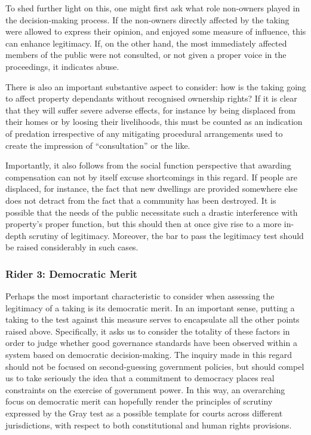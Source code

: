 To shed further light on this, one might first ask what role non-owners played in the decision-making process. If the non-owners directly affected by the taking were allowed to express their opinion, and enjoyed some measure of influence, this can enhance legitimacy. If, on the other hand, the most immediately affected members of the public were not consulted, or not given a proper voice in the proceedings, it indicates abuse.

There is also an important substantive aspect to consider: how is the taking going to affect property dependants without recognised ownership rights? If it is clear that they will suffer severe adverse effects, for instance by being displaced from their homes or by loosing their livelihoods, this must be counted as an indication of predation irrespective of any mitigating procedural arrangements used to create the impression of ``consultation'' or the like.

Importantly, it also follows from the social function perspective that awarding compensation can not by itself excuse shortcomings in this regard. If people are displaced, for instance, the fact that new dwellings are provided somewhere else does not detract from the fact that a community has been destroyed. It is possible that the needs of the public necessitate such a drastic interference with property's proper function, but this should then at once give rise to a more in-depth scrutiny of legitimacy. Moreover, the bar to pass the legitimacy test should be raised considerably in such cases.

\subsubsection*{Rider 3: Democratic Merit}

Perhaps the most important characteristic to consider when assessing the legitimacy of a taking is its democratic merit. In an important sense, putting a taking to the test against this measure serves to encapsulate all the other points raised above. Specifically, it asks us to consider the totality of these factors in order to judge whether good governance standards have been observed within a system based on democratic decision-making. The inquiry made in this regard should not be focused on second-guessing government policies, but should compel us to take seriously the idea that a commitment to democracy places real constraints on the exercise of government power. In this way, an overarching focus on democratic merit can hopefully render the principles of scrutiny expressed by the Gray test as a possible template for courts across different jurisdictions, with respect to both constitutional and human rights provisions.

